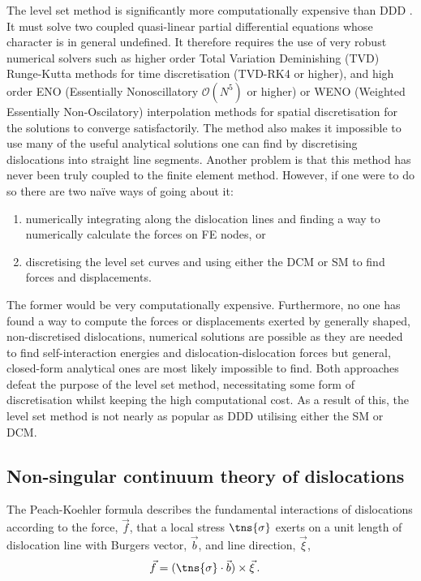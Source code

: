 The level set method is significantly more computationally expensive than DDD \cite{lvl_set_dd}. It must solve two coupled quasi-linear partial differential equations whose character is in general undefined. It therefore requires the use of very robust numerical solvers such as higher order Total Variation Deminishing (TVD) Runge-Kutta methods for time discretisation (TVD-RK4 or higher), and high order ENO (Essentially Nonoscillatory $ \mathcal{O}(N^5) $ or higher) or WENO (Weighted Essentially Non-Oscilatory) interpolation methods for spatial discretisation \cite{lvl_set_ddd_inc} for the solutions to converge satisfactorily. The method also makes it impossible to use many of the useful analytical solutions one can find by discretising dislocations into straight line segments. Another problem is that this method has never been truly coupled to the finite element method. However, if one were to do so there are two naïve ways of going about it:
\begin{enumerate}
  \item numerically integrating along the dislocation lines and finding a way to numerically calculate the forces on FE nodes, or
  \item discretising the level set curves and using either the DCM or SM to find forces and displacements.
\end{enumerate}
The former would be very computationally expensive. Furthermore, no one has found a way to compute the forces or displacements exerted by generally shaped, non-discretised dislocations, numerical solutions are possible as they are needed to find self-interaction energies and dislocation-dislocation forces \cite{lvl_set_dd} but general, closed-form analytical ones are most likely impossible to find. Both approaches defeat the purpose of the level set method, necessitating some form of discretisation whilst keeping the high computational cost. As a result of this, the level set method is not nearly as popular as DDD utilising either the SM or DCM.

\subsection{Non-singular continuum theory of dislocations}
\label{ss:non-singular_dln}

The Peach-Koehler formula describes the fundamental interactions of dislocations \cite{pk_force} according to the force, $ \vec{f} $, that a local stress $ \tns{\sigma} $ exerts on a unit length of dislocation line with Burgers vector, $ \vec{b} $, and line direction, $ \vec{\xi} $,
\begin{align}
  \vec{f} & = (\tns{\sigma} \cdot \vec{b}) \times \vec{\xi}\,.
\end{align}


